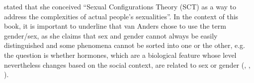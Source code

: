 \textcite[1178]{van2015beyond} stated that she conceived ``Sexual Configurations Theory (SCT) as a way to address the complexities of actual people’s sexualities''. In the context of this book, it is important to underline that van Anders chose to use the term gender/sex, as she claims that sex and gender cannot always be easily distinguished and some phenomena cannot be sorted into one or the other, e.g. the question is whether hormones, which are a biological feature whose level nevertheless changes based on the social context, are related to sex or gender (\cite[1181--1182]{van2015beyond}, \cite{lester2018trans}, \cite[59]{barker2019life}). 




